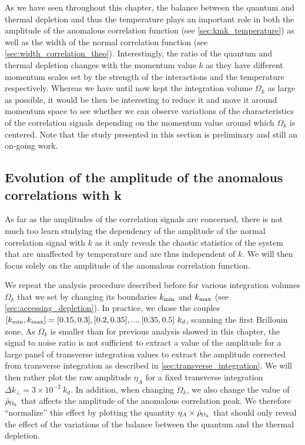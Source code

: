 As we have seen throughout this chapter, the balance between the quantum and thermal depletion and thus the temperature plays an important role in both the amplitude of the anomalous correlation function (see \ref{sec:kmk_temperature}) as well as the width of the normal correlation function (see \ref{sec:width_correlation_theo}). Interestingly, the ratio of the quantum and thermal depletion changes with the momentum value $k$ as they have different momentum scales set by the strength of the interactions and the temperature respectively. Whereas we have until now kept the integration volume $\Omega_k$ as large as possible, it would be then be interesting to reduce it and move it around momentum space to see whether we can observe variations of the characteristics of the correlation signals depending on the momentum value around which $\Omega_k$ is centered. Note that the study presented in this section is preliminary and still an on-going work.

\subsection{Evolution of the amplitude of the anomalous correlations with k}

As far as the amplitudes of the correlation signals are concerned, there is not much too learn studying the dependency of the amplitude of the normal correlation signal with $k$ as it only reveals the chaotic statistics of the system that are unaffected by temperature and are thus independent of $k$. We will then focus solely on the amplitude of the anomalous correlation function. 

We repeat the analysis procedure described before for various integration volumes $\Omega_k$ that we set by changing its boundaries $k_{\rm{min}}$ and $k_{\rm{max}}$ (see \ref{sec:accessing_depletion}). In practice, we chose the couples $[k_{\rm{min}},k_{\rm{max}}]=[0.15,0.3],[0.2,0.35],...,[0.35,0.5] \ k_d$, scanning the first Brillouin zone. As $\Omega_k$ is smaller than for previous analysis showed in this chapter, the signal to noise ratio is not sufficient to extract a value of the amplitude for a large panel of transverse integration values to extract the amplitude corrected from transverse integration as described in \ref{sec:transverse_integration}. We will then rather plot the raw amplitude $\eta_A$ for a fixed transverse integration $\Delta k_{\perp}=3 \times 10^{-2} \ k_d$. In addition, when changing $\Omega_k$, we also change the value of $\bar{\rho}_{\Omega_k}$ that affects the amplitude of the anomalous correlation peak. We therefore ``normalize'' this effect by plotting the quantity $\eta_A \times \bar{\rho}_{\Omega_k}$ that should only reveal the effect of the variations of the balance between the quantum and the thermal depletion.

